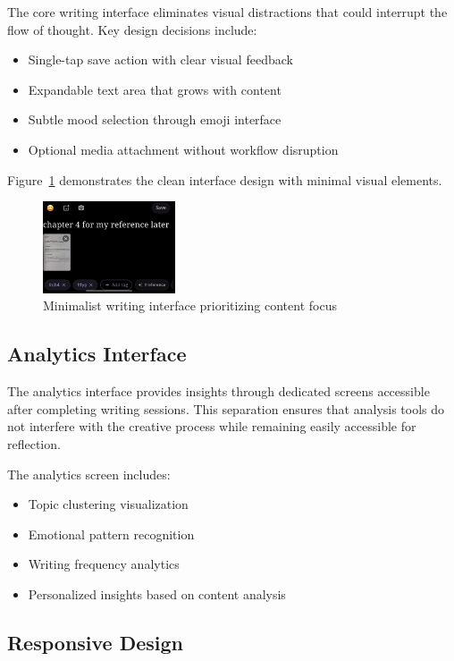 \documentclass[conference]{IEEEtran}
\begin{document}
The core writing interface eliminates visual distractions that could interrupt the flow of thought. Key design decisions include:

\begin{itemize}
\item Single-tap save action with clear visual feedback
\item Expandable text area that grows with content
\item Subtle mood selection through emoji interface
\item Optional media attachment without workflow disruption
\end{itemize}

Figure~\ref{fig:writing-interface} demonstrates the clean interface design with minimal visual elements.

\begin{figure}[h]
\centering
\includegraphics[width=0.35\textwidth]{../THESIS-WRITING/files/imgs/prototype/journal_input_basic.jpeg}
\caption{Minimalist writing interface prioritizing content focus}
\label{fig:writing-interface}
\end{figure}

\subsection{Analytics Interface}

The analytics interface provides insights through dedicated screens accessible after completing writing sessions. This separation ensures that analysis tools do not interfere with the creative process while remaining easily accessible for reflection.

The analytics screen includes:
\begin{itemize}
\item Topic clustering visualization
\item Emotional pattern recognition
\item Writing frequency analytics
\item Personalized insights based on content analysis
\end{itemize}

\subsection{Responsive Design}
\end{document}
